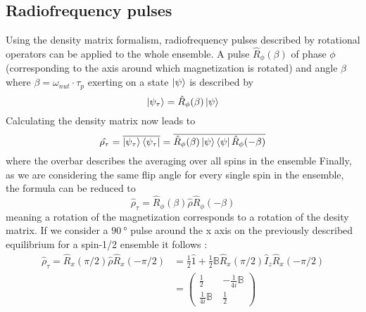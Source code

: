         \subsection{Radiofrequency pulses}
            Using the density matrix formalism, radiofrequency pulses described by rotational operators can be
            applied to the whole ensemble. A pulse $\hat R_\phi(\beta)$ of phase $\phi$ (corresponding
            to the axis around which magnetization is rotated) and angle $\beta$ where
            $\beta=\omega_{nut} \cdot \tau_p$ exerting on a state $\ket\psi$ is described by 
            \begin{equation}
                \ket{\psi_\tau}= \hat R_\phi(\beta)\ket\psi
            \end{equation}
            Calculating the density matrix now leads to
            \begin{equation}
                \hat {\rho_\tau} = \overline{\ket{\psi_\tau}\bra{\psi_\tau}} = \overline{\hat
                    R_{\phi}(\beta)\ket\psi\bra\psi \hat R_\phi(-\beta)}
            \end{equation}
            where the overbar describes the averaging over all spins in the ensemble \cite{popov_modern_1990, chizhik_magnetic_2014}
            Finally, as we are considering the same flip angle for every single spin in the ensemble,
            the formula can be reduced to
            \begin{equation}
                \hat\rho_\tau = \hat R_\phi(\beta) \hat \rho \hat R_\phi(-\beta)
            \end{equation}
            meaning a rotation of the magnetization corresponds to a rotation of the desity matrix.
            If we consider a $\SI{90}{\degree}$ pulse around the x axis on the previously described
            equilibrium for a spin-1/2 ensemble it follows \cite{hosur_scaling_1990, levitt_spin_nodate}:
            \begin{equation}
                \begin{split}
                    \hat\rho_\tau = \hat R_x(\pi/2)\hat\rho\hat R_x(-\pi/2) &= \frac{1}{2} \hat 1 +
                    \frac{1}{2} \mathbb{B}\hat R_x(\pi/2) \hat I_z \hat R_x(-\pi/2)\\
                    &=
                    \begin{pmatrix}
                        \frac{1}{2} & -\frac{1}{4i}\mathbb{B}\\
                        \frac{1}{4i}\mathbb{B}\ & \frac{1}{2}
                    \end{pmatrix}
                \end{split}
            \end{equation}
